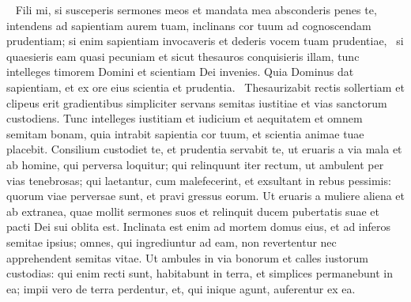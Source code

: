 \begin{biblechapter}   
\verse Fili mi, si susceperis sermones meos et mandata mea absconderis penes te, 
\verse intendens ad sapientiam aurem tuam, inclinans cor tuum ad cognoscendam prudentiam; 
\verse si enim sapientiam invocaveris et dederis vocem tuam prudentiae,  
\verse si quaesieris eam quasi pecuniam et sicut thesauros conquisieris illam, 
\verse tunc intelleges timorem Domini et scientiam Dei invenies. 
\verse Quia Dominus dat sapientiam, et ex ore eius scientia et prudentia.  
\verse Thesaurizabit rectis sollertiam et clipeus erit gradientibus simpliciter 
\verse servans semitas iustitiae et vias sanctorum custodiens. 
\verse Tunc intelleges iustitiam et iudicium et aequitatem et omnem semitam bonam, 
\verse quia intrabit sapientia cor tuum, et scientia animae tuae placebit. 
\verse Consilium custodiet te, et prudentia servabit te, 
\verse ut eruaris a via mala et ab homine, qui perversa loquitur; 
\verse qui relinquunt iter rectum, ut ambulent per vias tenebrosas; 
\verse qui laetantur, cum malefecerint, et exsultant in rebus pessimis: 
\verse quorum viae perversae sunt, et pravi gressus eorum. 
\verse Ut eruaris a muliere aliena et ab extranea, quae mollit sermones suos 
\verse et relinquit ducem pubertatis suae et pacti Dei sui oblita est. 
\verse Inclinata est enim ad mortem domus eius, et ad inferos semitae ipsius; 
\verse omnes, qui ingrediuntur ad eam, non revertentur nec apprehendent semitas vitae. 
\verse Ut ambules in via bonorum et calles iustorum custodias: 
\verse qui enim recti sunt, habitabunt in terra, et simplices permanebunt in ea; 
\verse impii vero de terra perdentur, et, qui inique agunt, auferentur ex ea. 
\end{biblechapter}

